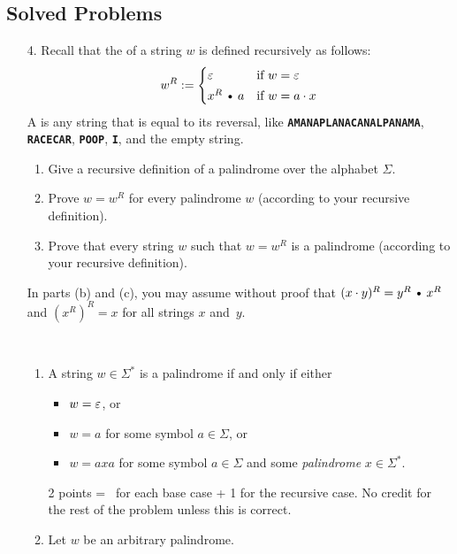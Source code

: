 \documentclass[11pt]{article}
\def\Cdot{\mathbin{\text{\normalfont \textbullet}}}
\def\Sym#1{\textbf{\texttt{\color{BrickRed}#1}}}
\begin{document}
\subsection*{Solved Problems}
\begin{enumerate}
\item[4.]
Recall that the  of a string $w$ is defined recursively as follows:
\[	
	w^R := \begin{cases}
		\e & \text{if $w=\e$} \\[0.5ex]
		x^R \Cdot a & \text{if $w=a\cdot x$}
	\end{cases}
\]
A  is any string that is equal to its reversal, like \Sym{AMANAPLANACANALPANAMA}, \hbox{\Sym{RACECAR}}, \Sym{POOP}, \Sym{I}, and the empty string.
\begin{enumerate}
\item
Give a recursive definition of a palindrome over the alphabet $\Sigma$.

\item
Prove $w = w^R$ for every palindrome $w$ (according to your recursive definition).  

\item
Prove that every string $w$ such that $w = w^R$ is a palindrome (according to your recursive definition).

\end{enumerate}
In parts (b) and (c), you may assume without proof that $(x\cdot y)^R = y^R\Cdot x^R$ and $(x^R)^R = x$ for all strings $x$ and~$y$.



\begin{solution}~
\begin{enumerate}
\item
A string $w\in\Sigma^*$ is a palindrome if and only if either
\begin{itemize}
\item $w = \varepsilon$, or
\item $w = a$ for some symbol $a\in\Sigma$, or
\item $w = axa$ for some symbol $a\in\Sigma$ and some \emph{palindrome} $x\in\Sigma^*$.
\end{itemize}

\begin{rubric}
2 points = \textonehalf\ for each base case + 1 for the recursive case.  No credit for the rest of the problem unless this is correct.
\end{rubric}


\medskip
\item
Let $w$ be an arbitrary palindrome.


\end{enumerate}
\end{solution}
\end{enumerate}
\end{document}
